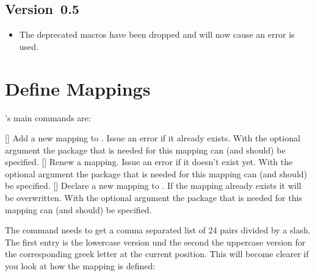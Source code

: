 \documentclass[load-preamble+]{cnltx-doc}
\begin{document}
\subsection{Version~0.5}
\begin{itemize}
  \item The deprecated macros  have been dropped and
    will now cause an error is used.
\end{itemize}

\section{Define Mappings}

\chemgreek's main commands are:
\begin{commands}
  []
    Add a new mapping to \chemgreek.  Issue an error if it
    already exists.  With the optional argument the package that is needed for
    this mapping can (and should) be specified.
  []
    Renew a \chemgreek{} mapping.  Issue an error if it
    doesn't exist yet.  With the optional argument the package that is needed
    for this mapping can (and should) be specified.
  []
    Declare a new mapping to \chemgreek.  If the mapping
    already exists it will be overwritten.  With the optional argument the
    package that is needed for this mapping can (and should) be specified.
\end{commands}

The command  needs to get a comma separated list of
24 pairs divided by a slash.  The first entry is the lowercase version und the
second the uppercase version for the corresponding greek letter at the current
position.  This will become clearer if you look at how the 
mapping is defined:
\end{document}
